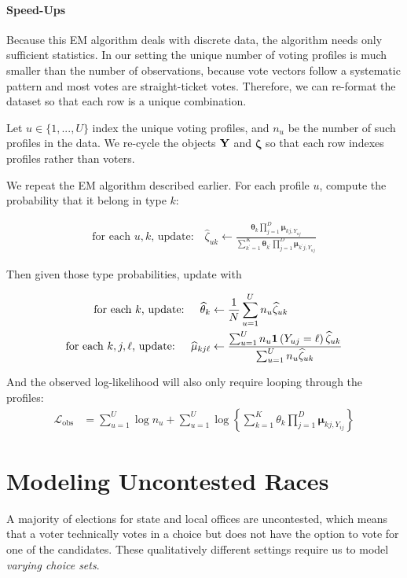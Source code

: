\documentclass[11pt]{article}
\begin{document}
\paragraph{Speed-Ups} Because this EM algorithm deals with discrete data, the algorithm needs only sufficient statistics. In our setting the unique number of voting profiles is much smaller than the number of observations, because vote vectors follow a systematic pattern and most votes are straight-ticket votes. Therefore, we can re-format the dataset so that each row is a unique combination.

Let \(u \in \{1, ..., U\}\) index the unique voting profiles, and \(n_{u}\) be the number of such profiles in the data.  We re-cycle the objects \(\mathbf{Y}\) and \(\bm\zeta\) so that each row indexes profiles rather than voters.

We repeat the EM algorithm described earlier. For each profile \(u\), compute the probability that it belong in type \(k\):

\begin{align}
\text{for each \(u, k\), update: }~~~   \widehat\zeta_{uk} \leftarrow \frac{\bm{\theta}_{k}\prod^{D}_{j=1}\bm{\mu}_{kj,Y_{uj}}}
{\sum^{K}_{k^\prime=1}\bm{\theta}_{k^\prime}\prod^{D}_{j=1}\bm{\mu}_{k^\prime j,Y_{uj}}}
\end{align}

Then given those type probabilities, update with

\begin{align}
\text{for each \(k\), update: }~~~   \widehat{\theta}_{k} &\leftarrow \frac{1}{N}\sum^U_{u = 1}n_{u}\widehat{\zeta}_{uk}\\
\text{for each \(k, j, \ell\), update: }~~~   \widehat{\mu}_{kj\ell} &\leftarrow\frac{\sum^U_{u=1}n_{u}\bm{1}\left(Y_{uj} = \ell\right)\widehat{\zeta}_{uk}}{\sum^{U}_{u=1}n_{u}\widehat{\zeta}_{uk}}
\end{align}

And the observed log-likelihood will also only require looping through the profiles:
\begin{align}
\mathcal{L}_{\text{obs}} &= \sum^{U}_{u=1}\log n_u + \sum^{U}_{u=1}\log\left\{\sum^{K}_{k=1}\theta_k \prod^{D}_{j=1}\bm{\mu}_{kj,Y_{ij}}\right\}
\end{align}


\section{Modeling Uncontested Races} 

A majority of elections for state and local offices are uncontested, which means that a voter technically votes in a choice but does not have the option to vote for one of the candidates. These qualitatively different settings require us to model \emph{varying choice sets}. 
\end{document}
